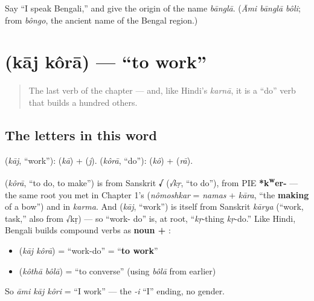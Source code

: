 \begin{tcolorbox}[breakable,colback=teal!4,colframe=teal!35!black,title={Before you move on}]
Say \textquotedblleft{}I speak Bengali,\textquotedblright{} and give the origin of the name \emph{bānglā}. (\emph{Āmi bānglā bôli}; from \emph{bôngo}, the ancient name of the Bengal region.)
\end{tcolorbox}
\section[\bn{কাজ} \bn{করা}]{  (kāj kôrā) — \textquotedblleft{}to work\textquotedblright{}}

\label{lesson:BN-C05-kaj-kora}



\begin{quote}
The last verb of the chapter — and, like Hindi's \emph{karnā}, it is a \textquotedblleft{}do\textquotedblright{} verb that builds a hundred others.
\end{quote}

\subsection*{The letters in this word}
\textbf{} (\emph{kāj}, \textquotedblleft{}work\textquotedblright{}): \textbf{} (\emph{kā}) + \textbf{} (\emph{j}). \textbf{} (\emph{kôrā}, \textquotedblleft{}do\textquotedblright{}): \textbf{} (\emph{kô}) + \textbf{} (\emph{rā}).

\begin{cousinweb}
\textbf{} (\emph{kôrā}, \textquotedblleft{}to do, to make\textquotedblright{}) is from Sanskrit \textbf{√} (\emph{√kṛ}, \textquotedblleft{}to do\textquotedblright{}), from PIE \textbf{*k\textsuperscript{w}er-} — the same root you met in Chapter 1's \textbf{} (\emph{nômoshkar} = \emph{namas} + \emph{kāra}, \textquotedblleft{}the \textbf{making} of a bow\textquotedblright{}) and in \emph{karma}. And \textbf{} (\emph{kāj}, \textquotedblleft{}work\textquotedblright{}) is itself from Sanskrit \emph{kārya} (\textquotedblleft{}work, task,\textquotedblright{} also from √kṛ) — so \textquotedblleft{}work- do\textquotedblright{} is, at root, \textquotedblleft{}\emph{kṛ}-thing \emph{kṛ}-do.\textquotedblright{} Like Hindi, Bengali builds compound verbs as \textbf{noun + }:

\begin{itemize}
\raggedright
  \item \textbf{ } (\emph{kāj kôrā}) = \textquotedblleft{}work-do\textquotedblright{} = \textquotedblleft{}\textbf{to work}\textquotedblright{}
  \item \textbf{ } (\emph{kôthā bôlā}) = \textquotedblleft{}to converse\textquotedblright{} (using \emph{bôlā} from earlier)
\end{itemize}

So \emph{āmi kāj kôri} = \textquotedblleft{}I work\textquotedblright{} — the \emph{-i} \textquotedblleft{}I\textquotedblright{} ending, no gender.
\end{cousinweb}

